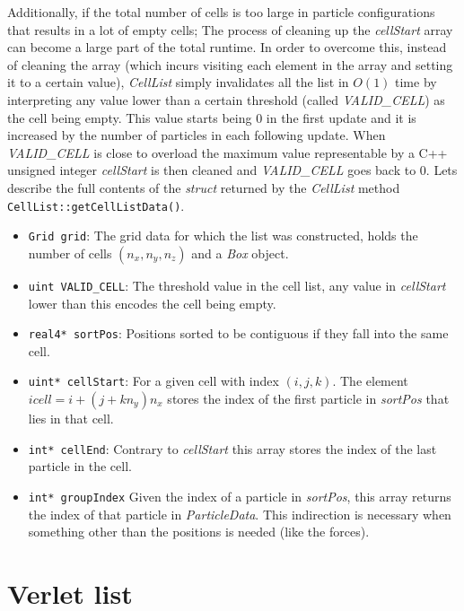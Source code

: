 \documentclass[ twoside,openright,titlepage,numbers=noenddot,%
headinclude,footinclude,cleardoublepage=empty,abstract=on,
BCOR=5mm,paper=a4,fontsize=11pt, dvipsnames
]{scrreprt}
\def\ucpp{uammd_cpp_lexer.py:UAMMDCppLexer -x}
\begin{document}
Additionally, if the total number of cells is too large in particle configurations that results in a lot of empty cells; The process of cleaning up the \emph{cellStart} array can become a large part of the total runtime. In order to overcome this, instead of cleaning the array (which incurs visiting each element in the array and setting it to a certain value), \emph{CellList} simply invalidates all the list in $O(1)$ time by interpreting any value lower than a certain threshold (called \emph{VALID\_CELL}) as the cell being empty.
This value starts being $0$ in the first update and it is increased by the number of particles in each following update. When \emph{VALID\_CELL} is close to overload the maximum value representable by a C++ unsigned integer \emph{cellStart} is then cleaned and \emph{VALID\_CELL} goes back to $0$.
Lets describe the full contents of the \emph{struct} returned by the \emph{CellList} method \texttt{CellList::getCellListData()}.
\begin{itemize}
\item\texttt{Grid grid}:
  The grid data for which the list was constructed, holds the number of cells $(n_x, n_y, n_z)$ and a \emph{Box} object.
\item\texttt{uint VALID_CELL}:
  The threshold value in the cell list, any value in \emph{cellStart} lower than this encodes the cell being empty. 
\item\texttt{real4* sortPos}:
  Positions sorted to be contiguous if they fall into the same cell. 
\item\texttt{uint* cellStart}:
  For a given cell with index $(i,j,k)$. The element $icell = i + (j + kn_y)n_x$ stores the index of the first particle in \emph{sortPos} that lies in that cell.
\item\texttt{int* cellEnd}:
  Contrary to \emph{cellStart} this array stores the index of the last particle in the cell.
\item\texttt{int* groupIndex}
  Given the index of a particle in \emph{sortPos}, this array returns the index of that particle in \emph{ParticleData}.
  This indirection is necessary when something other than the positions is needed (like the forces).
\end{itemize}


\section{Verlet list}\label{sec:verletlist}
\end{document}
